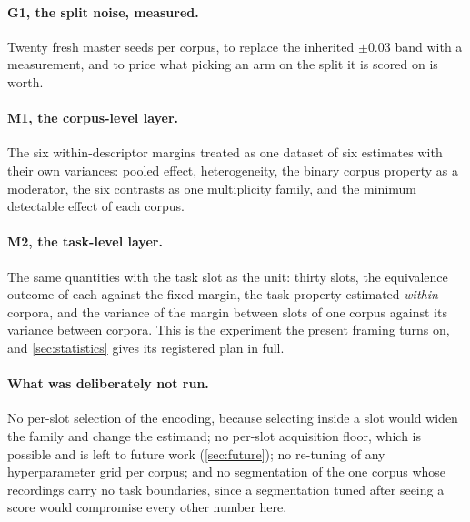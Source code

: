 \paragraph{G1, the split noise, measured.} Twenty fresh master seeds per corpus, to replace the
inherited $\pm 0.03$ band with a measurement, and to price what picking an arm on the split it is
scored on is worth.

\paragraph{M1, the corpus-level layer.} The six within-descriptor margins treated as one dataset of
six estimates with their own variances: pooled effect, heterogeneity, the binary corpus property as
a moderator, the six contrasts as one multiplicity family, and the minimum detectable effect of each
corpus.

\paragraph{M2, the task-level layer.} The same quantities with the task slot as the unit: thirty
slots, the equivalence outcome of each against the fixed margin, the task property estimated
\emph{within} corpora, and the variance of the margin between slots of one corpus against its
variance between corpora. This is the experiment the present framing turns on, and
\cref{sec:statistics} gives its registered plan in full.

\paragraph{What was deliberately not run.} No per-slot selection of the encoding, because selecting
inside a slot would widen the family and change the estimand; no per-slot acquisition floor, which
is possible and is left to future work (\cref{sec:future}); no re-tuning of any hyperparameter grid
per corpus; and no segmentation of the one corpus whose recordings carry no task boundaries, since
a segmentation tuned after seeing a score would compromise every other number here.
